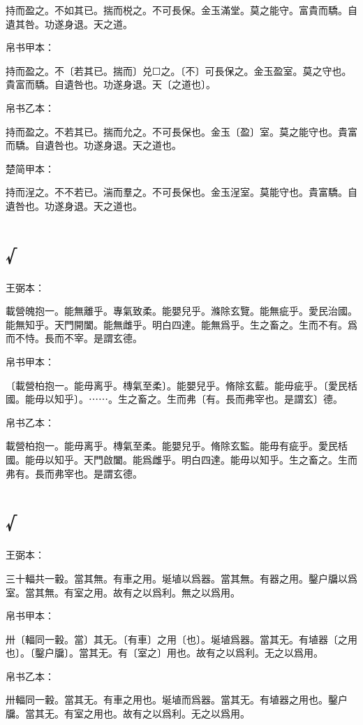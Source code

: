 \documentclass[a5paper]{ctexbook}
\begin{document}
    持而盈之。不如其已。揣而棁之。不可長保。金玉滿堂。莫之能守。富貴而驕。自遺其咎。功遂身退。天之道。

    
    帛书甲本：

    持而盈之。不〔若其已。揣而〕兑☐之。〔不〕可長保之。金玉盈室。莫之守也。貴富而驕。自遺咎也。功遂身退。天〔之道也〕。

    帛书乙本：

    持而盈之。不若其已。揣而允之。不可長保也。金玉〔盈〕室。莫之能守也。貴富而驕。自遺咎也。功遂身退。天之道也。

    楚简甲本：

    持而浧之。不不若已。湍而羣之。不可長保也。金玉浧室。莫能守也。貴富驕。自遺咎也。功遂身退。天之道也。

    \chapter{√}
    王弼本：

    載營魄抱一。能無離乎。專氣致柔。能嬰兒乎。滌除玄覽。能無疵乎。愛民治國。能無知乎。天門開闔。能無雌乎。明白四達。能無爲乎。生之畜之。生而不有。爲而不恃。長而不宰。是謂玄德。

    
    帛书甲本：

    〔載營柏抱一。能毋离乎。槫氣至柔〕。能嬰兒乎。脩除玄藍。能毋疵乎。〔愛民栝國。能毋以知乎〕。⋯⋯。生之畜之。生而弗〔有。長而弗宰也。是謂玄〕德。

    帛书乙本：

    載營柏抱一。能毋离乎。槫氣至柔。能嬰兒乎。脩除玄監。能毋有疵乎。愛民栝國。能毋以知乎。天門啟闔。能爲雌乎。明白四達。能毋以知乎。生之畜之。生而弗有。長而弗宰也。是謂玄德。

    \chapter{√}
    王弼本：

    三十輻共一轂。當其無。有車之用。埏埴以爲器。當其無。有器之用。鑿户牖以爲室。當其無。有室之用。故有之以爲利。無之以爲用。

    
    帛书甲本：

    卅〔輻同一轂。當〕其无。〔有車〕之用〔也〕。埏埴爲器。當其无。有埴器〔之用也〕。〔鑿户牖〕。當其无。有〔室之〕用也。故有之以爲利。无之以爲用。

    帛书乙本：

    卅輻同一轂。當其无。有車之用也。埏埴而爲器。當其无。有埴器之用也。鑿户牖。當其无。有室之用也。故有之以爲利。无之以爲用。
\end{document}

